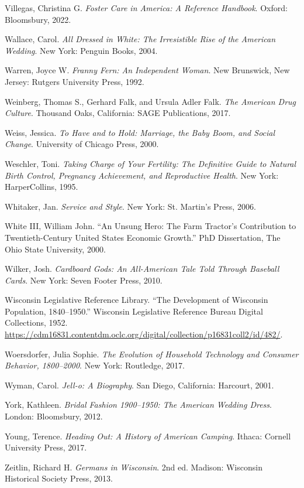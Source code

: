 \documentclass[
  letterpaper,
]{book}
\newlength{\cslhangindent}
\newenvironment{CSLReferences}[2] %
 {\begin{list}{}{%
  \setlength{\itemindent}{0pt}
  \setlength{\leftmargin}{0pt}
  \setlength{\parsep}{0pt}
  \ifodd #1
   \setlength{\leftmargin}{\cslhangindent}
   \setlength{\itemindent}{-1\cslhangindent}
  \fi
  \setlength{\itemsep}{#2\baselineskip}}}
 {\end{list}}
\begin{document}
\begin{CSLReferences}{1}{0}
Villegas, Christina G. \emph{Foster Care in America: A Reference
Handbook}. Oxford: Bloomsbury, 2022.

Wallace, Carol. \emph{All Dressed in White: The Irresistible Rise of the
American Wedding}. New York: Penguin Books, 2004.

Warren, Joyce W. \emph{Franny Fern: An Independent Woman}. New
Brunswick, New Jersey: Rutgers University Press, 1992.

Weinberg, Thomas S., Gerhard Falk, and Ursula Adler Falk. \emph{The
American Drug Culture}. Thousand Oaks, California: SAGE Publications,
2017.

Weiss, Jessica. \emph{To Have and to Hold: Marriage, the Baby Boom, and
Social Change}. University of Chicago Press, 2000.

Weschler, Toni. \emph{Taking Charge of Your Fertility: The Definitive
Guide to Natural Birth Control, Pregnancy Achievement, and Reproductive
Health}. New York: HarperCollins, 1995.

Whitaker, Jan. \emph{Service and Style}. New York: St. Martin's Press,
2006.

White III, William John. {``An Unsung Hero: The Farm Tractor's
Contribution to Twentieth-Century United States Economic Growth.''} PhD
Dissertation, The Ohio State University, 2000.

Wilker, Josh. \emph{Cardboard Gods: An All-American Tale Told Through
Baseball Cards}. New York: Seven Footer Press, 2010.

Wisconsin Legislative Reference Library. {``The Development of Wisconsin
Population, 1840--1950.''} Wisconsin Legislative Reference Bureau
Digital Collections, 1952.
\url{https://cdm16831.contentdm.oclc.org/digital/collection/p16831coll2/id/482/}.

Woersdorfer, Julia Sophie. \emph{The Evolution of Household Technology
and Consumer Behavior, 1800--2000}. New York: Routledge, 2017.

Wyman, Carol. \emph{Jell-o: A Biography}. San Diego, California:
Harcourt, 2001.

York, Kathleen. \emph{Bridal Fashion 1900--1950: The American Wedding
Dress}. London: Bloomsbury, 2012.

Young, Terence. \emph{Heading Out: A History of American Camping}.
Ithaca: Cornell University Press, 2017.

Zeitlin, Richard H. \emph{Germans in Wisconsin}. 2nd ed. Madison:
Wisconsin Historical Society Press, 2013.

\end{CSLReferences}


\backmatter
\end{document}
